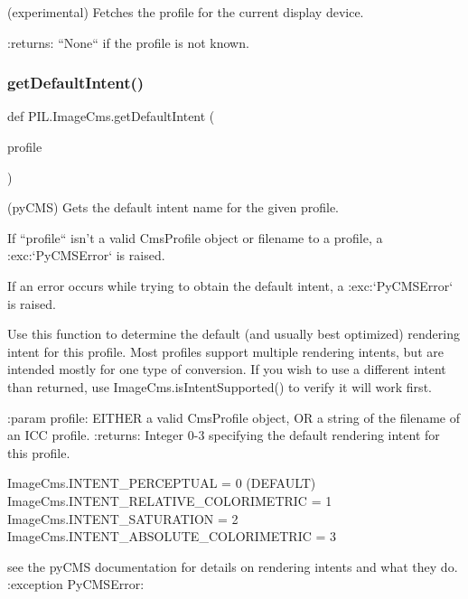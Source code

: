 \begin{DoxyVerb}(experimental) Fetches the profile for the current display device.

:returns: ``None`` if the profile is not known.
\end{DoxyVerb}
 \mbox{\label{namespacePIL_1_1ImageCms_a39c5fba9c276ad18df6525b18f10018c}} 
\subsubsection{\texorpdfstring{get\+Default\+Intent()}{getDefaultIntent()}}
{\footnotesize\ttfamily def P\+I\+L.\+Image\+Cms.\+get\+Default\+Intent (\begin{DoxyParamCaption}\item[{}]{profile }\end{DoxyParamCaption})}

\begin{DoxyVerb}(pyCMS) Gets the default intent name for the given profile.

If ``profile`` isn't a valid CmsProfile object or filename to a profile, a
:exc:`PyCMSError` is raised.

If an error occurs while trying to obtain the default intent, a
:exc:`PyCMSError` is raised.

Use this function to determine the default (and usually best optimized)
rendering intent for this profile.  Most profiles support multiple
rendering intents, but are intended mostly for one type of conversion.
If you wish to use a different intent than returned, use
ImageCms.isIntentSupported() to verify it will work first.

:param profile: EITHER a valid CmsProfile object, OR a string of the
    filename of an ICC profile.
:returns: Integer 0-3 specifying the default rendering intent for this
    profile.

        ImageCms.INTENT_PERCEPTUAL            = 0 (DEFAULT)
        ImageCms.INTENT_RELATIVE_COLORIMETRIC = 1
        ImageCms.INTENT_SATURATION            = 2
        ImageCms.INTENT_ABSOLUTE_COLORIMETRIC = 3

    see the pyCMS documentation for details on rendering intents and what
        they do.
:exception PyCMSError:
\end{DoxyVerb}
 \mbox{\label{namespacePIL_1_1ImageCms_a13bffc754abdb406a1bbd8f282c97ebb}} 
